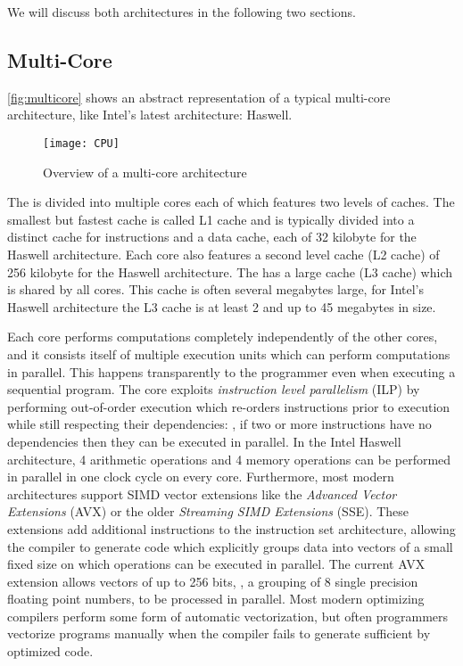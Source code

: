 We will discuss both architectures in the following two sections.

\subsection{Multi-Core \CPUs}
\autoref{fig:multicore} shows an abstract representation of a typical multi-core \CPU architecture, like Intel's latest \CPU architecture: Haswell.
\begin{figure}
  \centering
  \texttt{[image: CPU]}
  \caption{Overview of a multi-core \CPU architecture}
  \label{fig:multicore}
\end{figure}
The \CPU is divided into multiple cores each of which features two levels of caches.
The smallest but fastest cache is called L1 cache and is typically divided into a distinct cache for instructions and a data cache, each of 32 kilobyte for the Haswell architecture.
Each core also features a second level cache (L2 cache) of 256 kilobyte for the Haswell architecture.
The \CPU has a large cache (L3 cache) which is shared by all cores.
This cache is often several megabytes large, for Intel's Haswell architecture the L3 cache is at least 2 and up to 45 megabytes in size.

Each \CPU core performs computations completely independently of the other cores, and it consists itself of multiple execution units which can perform computations in parallel.
This happens transparently to the programmer even when executing a sequential program.
The \CPU core exploits \emph{instruction level parallelism} (ILP) by performing out-of-order execution which re-orders instructions prior to execution while still respecting their dependencies:
\eg, if two or more instructions have no dependencies then they can be executed in parallel.
In the Intel Haswell architecture, 4 arithmetic operations and 4 memory operations can be performed in parallel in one clock cycle on every core.
Furthermore, most modern \CPU architectures support SIMD vector extensions like the \emph{Advanced Vector Extensions} (AVX) or the older \emph{Streaming SIMD Extensions} (SSE).
These extensions add additional instructions to the instruction set architecture, allowing the compiler to generate code which explicitly groups data into vectors of a small fixed size on which operations can be executed in parallel.
The current AVX extension allows vectors of up to 256 bits, \eg, a grouping of 8 single precision floating point numbers, to be processed in parallel.
Most modern optimizing compilers perform some form of automatic vectorization, but often programmers vectorize programs manually when the compiler fails to generate sufficient by optimized code.

